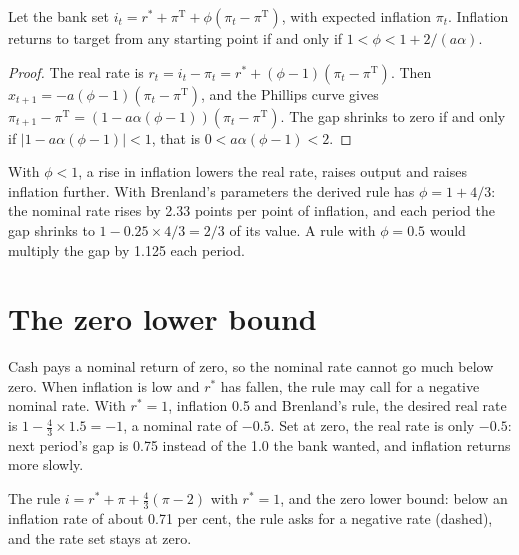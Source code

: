 \begin{proposition}\label{prop:b2:three-equation-model:principle}
Let the bank set $i_t = r^* + \pi^{\mathrm T} + \phi(\pi_t - \pi^{\mathrm T})$, with expected inflation $\pi_t$. Inflation returns to target from any starting point if and only if $1 < \phi < 1 + 2/(a\alpha)$.
\end{proposition}

\begin{proof}
The real rate is $r_t = i_t - \pi_t = r^* + (\phi - 1)(\pi_t - \pi^{\mathrm T})$. Then $x_{t+1} = -a(\phi - 1)(\pi_t - \pi^{\mathrm T})$, and the Phillips curve gives $\pi_{t+1} - \pi^{\mathrm T} = (1 - a\alpha(\phi - 1))(\pi_t - \pi^{\mathrm T})$. The gap shrinks to zero if and only if $|1 - a\alpha(\phi - 1)| < 1$, that is
$0 < a\alpha(\phi - 1) < 2$.
\end{proof}

With $\phi < 1$, a rise in inflation lowers the real rate, raises output and raises inflation further. With Brenland's parameters the derived rule
has $\phi = 1 + 4/3$: the nominal rate rises by 2.33 points per point of inflation, and each period the gap shrinks to $1 - 0.25 \times 4/3 = 2/3$ of its value. A rule with
$\phi = 0.5$ would multiply the gap by 1.125 each period.

\section{The zero lower bound}\label{sec:b2:three-equation-model:zlb}

Cash pays a nominal return of zero, so the nominal rate cannot go much below zero. When inflation is low and $r^*$ has fallen, the rule
may call for a negative nominal rate. With $r^* = 1$, inflation 0.5 and Brenland's rule, the desired real rate is $1 - \tfrac43 \times 1.5 = -1$, a nominal rate of $-0.5$. Set at zero, the real rate is only $-0.5$: next
period's gap is 0.75 instead of the 1.0 the bank wanted, and inflation returns more slowly.

\begin{omfigure}

{\small The rule $i = r^* + \pi + \tfrac43(\pi - 2)$ with $r^* = 1$, and the zero lower bound: below an inflation rate of about 0.71 per cent, the rule asks for a negative rate
(dashed), and the rate set stays at zero.}
\end{omfigure}


